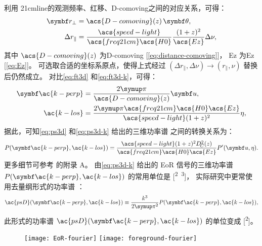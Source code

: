 利用 \ac{21cmline}的观测频率、红移、\acl{D-comoving}之间的对应关系，可得：
\begin{align}
  \B{r}_{\perp} & = \acs{D-comoving}(z) \,\B{\theta} , \\
  \Delta r_{\parallel}
    & = \frac{\acs{speed-light}}{\acs{freq21cm} \acs{H0}}
      \frac{(1+z)^2}{\acs{Ez}} \Delta \nu ,
\end{align}
其中 $\acs{D-comoving}(z)$ 为\acl{D-comoving}
[\autoref{eq:distance-comoving}]，
\acs{Ez} 为\acl{Ez} [\autoref{eq:Ez}]。
可选取合适的坐标系原点，使得上式经过
$(\Delta r_{\parallel}, \Delta\nu) \to (r_{\parallel}, \nu)$
替换后仍然成立。
对比\autoref{eq:ft3d} 和\autoref{eq:ft3d-k}，可得：
\begin{align}
  \B{\ac{k-perp}} & = \frac{2\Cpi}{\acs{D-comoving}(z)} \B{u} ,
  \label{eq:kperp-u}  \\
  \ac{k-los} & =
    \frac{2\Cpi \acs{freq21cm} \acs{H0}\acs{Ez}}{\acs{speed-light}
      (1+z)^2} \eta ,
  \label{eq:klos-eta}
\end{align}
据此，可知\autoref{eq:ps3d} 和\autoref{eq:ps3d-k} 给出的三维功率谱
之间的转换关系为：
\begin{equation}
  P(\B{\ac{k-perp}}, \ac{k-los}) =
    \frac{\acs{speed-light} (1+z)^2 D_{\!C}^2(z)}{
      \acs{freq21cm} \acs{H0} \acs{Ez}}
    P'(\B{u}, \eta) .
\end{equation}
更多细节可参考  的附录 A。
由\autoref{eq:ps3d-k} 给出的 EoR 信号的三维功率谱
$P(\B{\ac{k-perp}}, \ac{k-los})$ 的常用单位是 [\si{\mK\squared\Mpc\cubed}]，
实际研究中更常使用去量纲形式的功率谱 \cite{peacock1996}：
\begin{equation}
  \label{eq:ps3d-k2}
  \ac{psD}(\B{\ac{k-perp}}, \ac{k-los})
    \equiv \frac{k^3}{2\Cpi^2} P(\B{\ac{k-perp}}, \ac{k-los}) ,
\end{equation}
此形式的功率谱 $\ac{psD}(\B{\ac{k-perp}}, \ac{k-los})$
的单位变成 [\si{\mK\squared}]。

\begin{figure}[htp]
  \centering
  \texttt{[image: EoR-fourier]}%
  \texttt{[image: foreground-fourier]}
  \label{fig:eor-fg-fourier}
\end{figure}

